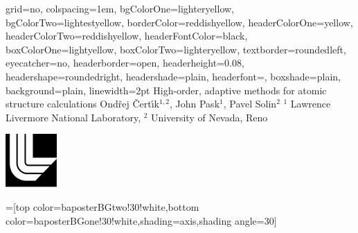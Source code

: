 \documentclass[landscape,final]{baposter}
\begin{document}
\begin{poster}{
  grid=no,
  colspacing=1em,
  bgColorOne=lighteryellow,
  bgColorTwo=lightestyellow,
  borderColor=reddishyellow,
  headerColorOne=yellow,
  headerColorTwo=reddishyellow,
  headerFontColor=black,
  boxColorOne=lightyellow,
  boxColorTwo=lighteryellow,
  textborder=roundedleft,
  eyecatcher=no,
  headerborder=open,
  headerheight=0.08\textheight,
  headershape=roundedright,
  headershade=plain,
  headerfont=\Large\textsf, %
  boxshade=plain,
  background=plain,
  linewidth=2pt
  }
  {} %
  {\sf %
  High-order, adaptive methods for atomic structure calculations}
  {\sf %
  Ond\v rej \v Cert\'\i k$^{1,2}$, John Pask$^1$, Pavel Solin$^2$
  \hspace{3em}$^1$ Lawrence Livermore National Laboratory,
  $^2$ University of Nevada, Reno
  }
  {{\begin{minipage}{16em}
    \hfill
    \includegraphics[height=5.5em]{llnl_logo}
  \end{minipage}}
  }

  =[top color=baposterBGtwo!30!white,bottom color=baposterBGone!30!white,shading=axis,shading angle=30]

     \newlength{\leftimgwidth}
     \setlength{\leftimgwidth}{0.78em+8.0em}

    \newcommand{\colouredcircle}[1]{%
      \tikz{\useasboundingbox (-0.2em,-0.32em) rectangle(0.2em,0.32em); \draw[draw=black,fill=baposterBGone!80!black!#1!white,line width=0.03em] (0,0) circle(0.18em);}}


\end{poster}
\end{document}

